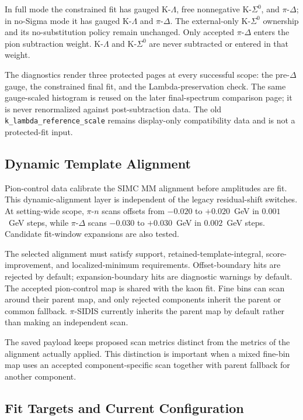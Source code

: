 \documentclass[11pt]{article}
\begin{document}
In full mode the constrained fit has gauged K-$\Lambda$, free nonnegative
K-$\Sigma^0$, and $\pi$-$\Delta$; in no-Sigma mode it has gauged K-$\Lambda$
and $\pi$-$\Delta$.  The external-only K-$\Sigma^0$ ownership and its
no-substitution policy remain unchanged.  Only accepted $\pi$-$\Delta$ enters
the pion subtraction weight.  K-$\Lambda$ and K-$\Sigma^0$ are never
subtracted or entered in that weight.

The diagnostics render three protected pages at every successful scope: the
pre-$\Delta$ gauge, the constrained final fit, and the Lambda-preservation
check.  The same gauge-scaled histogram is reused on the later final-spectrum
comparison page; it is never renormalized against post-subtraction data.  The
old \texttt{k\_lambda\_reference\_scale} remains display-only compatibility
data and is not a protected-fit input.

\subsection{Dynamic Template Alignment}

Pion-control data calibrate the SIMC MM alignment before amplitudes are fit.
This dynamic-alignment layer is independent of the legacy residual-shift
switches.  At setting-wide scope, $\pi$-$n$ scans offsets from $-0.020$ to
$+0.020$~GeV in $0.001$~GeV steps, while $\pi$-$\Delta$ scans $-0.030$ to
$+0.030$~GeV in $0.002$~GeV steps.  Candidate fit-window expansions are also
tested.

The selected alignment must satisfy support, retained-template-integral,
score-improvement, and localized-minimum requirements.  Offset-boundary hits
are rejected by default; expansion-boundary hits are diagnostic warnings by
default.  The accepted pion-control map is shared with the kaon fit.  Fine
bins can scan around their parent map, and only rejected components inherit
the parent or common fallback.  $\pi$-SIDIS currently inherits the parent map
by default rather than making an independent scan.

The saved payload keeps proposed scan metrics distinct from the metrics of the
alignment actually applied.  This distinction is important when a mixed
fine-bin map uses an accepted component-specific scan together with parent
fallback for another component.

\subsection{Fit Targets and Current Configuration}
\end{document}
